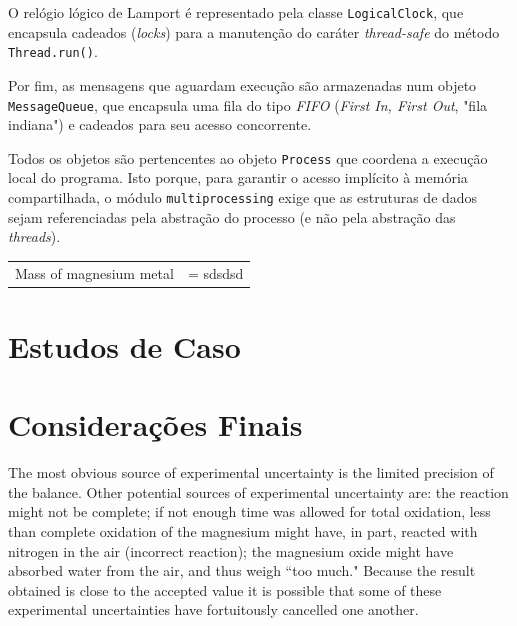 \documentclass[a4paper,12pt]{article}
\begin{document}
        O relógio lógico de Lamport é representado pela classe \texttt{LogicalClock}, que encapsula cadeados (\emph{locks}) para a manutenção do caráter \emph{thread-safe} do método \texttt{Thread.run()}.

        Por fim, as mensagens que aguardam execução são armazenadas num objeto \texttt{MessageQueue}, que encapsula uma fila do tipo \emph{FIFO} (\emph{First In, First Out}, "fila indiana") e cadeados para seu acesso concorrente.

        Todos os objetos são pertencentes ao objeto \texttt{Process} que coordena a execução local do programa.
        Isto porque, para garantir o acesso implícito à memória compartilhada, o módulo \texttt{multiprocessing} exige que as estruturas de dados sejam referenciadas pela abstração do processo (e não pela abstração das \emph{threads}).

            \begin{tabular}{ll}
                Mass of magnesium metal & = sdsdsd
            \end{tabular}
            
        
        \section{Estudos de Caso}
        
        
        
        
        
        \section{Considerações Finais}
        
        
        The most obvious source of experimental uncertainty is the limited precision of the balance. Other potential sources of experimental uncertainty are: the reaction might not be complete; if not enough time was allowed for total oxidation, less than complete oxidation of the magnesium might have, in part, reacted with nitrogen in the air (incorrect reaction); the magnesium oxide might have absorbed water from the air, and thus weigh ``too much." Because the result obtained is close to the accepted value it is possible that some of these experimental uncertainties have fortuitously cancelled one another.
\end{document}
